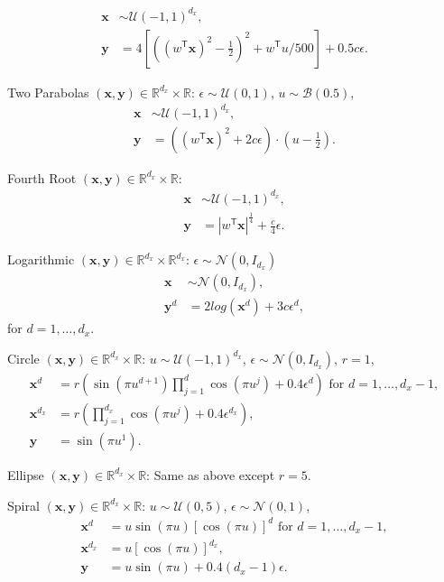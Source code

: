 \documentclass[11pt]{article}
\providecommand{\mb}[1]{\boldsymbol{#1}}
\providecommand{\mc}[1]{\mathcal{#1}}
\newcommand{\Real}{\mathbb{R}}
\newcommand{\T}{^{\ensuremath{\mathsf{T}}}}           %
\newcommand{\mbx}{\ensuremath{\mb{x}}}
\newcommand{\mby}{\ensuremath{\mb{y}}}
\begin{document}
\begin{compactenum}
\begin{align*}
\mbx &\sim \mc{U}(-1,1)^{d_{x}},\\
\mby&=4\left[ \left( (w\T \mbx)^2 - \tfrac{1}{2} \right)^2 + w\T u/500 \right]+0.5c\epsilon.
\end{align*}
\item Two Parabolas $(\mbx,\mby) \in \Real^{d_{x}} \times \Real$: $\epsilon \sim \mc{U}(0,1)$, $u \sim \mc{B}(0.5)$,
\begin{align*}
\mbx &\sim \mc{U}(-1,1)^{d_{x}},\\
\mby&=\left( (w\T \mbx)^2  + 2c\epsilon\right) \cdot (u-\tfrac{1}{2}).
\end{align*}
\item Fourth Root $(\mbx,\mby) \in \Real^{d_{x}} \times \Real$:
\begin{align*}
\mbx &\sim \mc{U}(-1,1)^{d_{x}},\\
\mby&=|w\T \mbx|^\frac{1}{4}+\frac{c}{4}\epsilon.
\end{align*}
\item Logarithmic $(\mbx,\mby) \in \Real^{d_{x}} \times \Real^{d_{x}}$: $\epsilon \sim \mc{N}(0, I_{d_{x}})$
\begin{align*}
\mbx &\sim \mc{N}(0, I_{d_{x}}),\\
\mby^{d}&=2log(\mbx^{d})+3c\epsilon^{d},
\end{align*}
for $d=1,\ldots,d_{x}$.
\item Circle $(\mbx,\mby) \in \Real^{d_{x}} \times \Real$: $u \sim \mc{U}(-1,1)^{d_{x}}$, $\epsilon \sim \mc{N}(0, I_{d_{x}})$, $r=1$,
\begin{align*}
\mbx^{d}&=r \left(\sin(\pi u^{d+1})  \prod_{j=1}^{d} \cos(\pi u^{j})+0.4 \epsilon^{d}\right) \mbox{ for $d=1,\ldots,d_{x}-1$},\\
\mbx^{d_{x}}&=r \left(\prod_{j=1}^{d_{x}} \cos(\pi u^{j})+0.4 \epsilon^{d_{x}}\right),\\
\mby&= \sin(\pi u^{1}).
\end{align*}
\item Ellipse $(\mbx,\mby) \in \Real^{d_{x}} \times \Real$: Same as above except $r=5$.

\item Spiral $(\mbx,\mby) \in \Real^{d_{x}} \times \Real$: $u \sim \mc{U}(0,5)$, $\epsilon \sim \mc{N}(0, 1)$,
\begin{align*}
\mbx^{d}&=u \sin(\pi u)  [\cos(\pi u)]^{d} \mbox{ for $d=1,\ldots,d_{x}-1$},\\
\mbx^{d_{x}}&=u [\cos(\pi u)]^{d_{x}},\\
\mby&= u \sin(\pi u) +0.4 (d_{x}-1)\epsilon.
\end{align*}


\end{compactenum}
\end{document}

